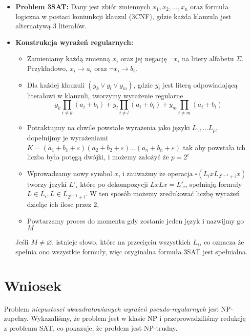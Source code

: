 \documentclass[11pt]{scrartcl}
\begin{document}
\begin{itemize}
    \item \textbf{Problem 3SAT:} Dany jest zbiór zmiennych \( x_1, x_2, \ldots, x_n \) oraz formuła logiczna w postaci koniunkcji klauzul (3CNF), gdzie każda klauzula jest alternatywą 3 literałów.
    \item \textbf{Konstrukcja wyrażeń regularnych:}
    \begin{itemize}
        \item Zamieniamy każdą zmienną \( x_i \) oraz jej negację \( \neg x_i \) na litery alfabetu \( \Sigma \). Przykładowo, \( x_i \rightarrow a_i \) oraz \( \neg x_i \rightarrow b_i \).
      \item Dla każdej klauzuli \( (y_k \lor y_l \lor y_m) \), gdzie \( y_i \) jest literą odpowiadającą literałowi w klauzuli, tworzymy wyrażenie regularne 
        \[ 
          y_k \prod_{i \not = k} (a_i + b_i) + y_l \prod_{i \not = l} (a_i + b_i) + y_m \prod_{i \not = m} (a_i + b_i)
        \]

      \item Potraktujmy na chwile powstałe wyrażenia jako języki $L_1, \dots L_p$, dopełnijmy je wyrażeniami $K = (a_1 + b_1 + \varepsilon)(a_2 + b_2 + \varepsilon) \dots (a_n + b_n + \varepsilon)$ tak aby powstała ich liczba była potęgą dwójki, i możemy założyć że $p = 2^c$
      \item Wprowadzamy nowy symbol $x$, i zauważmy że operacja $\square(L_i x L_{2^{c-1}+i} x)$ tworzy języki $L'_i$ które po dekompozycji $L x L x = L'_i$, spełniają formuły $L \in L_i, L \in L_{2^{c-1}+i}$. W ten sposób możemy zredukować liczbę wyrażeń dzieląc ich ilosc przez 2,
      \item Powtarzamy proces do momentu gdy zostanie jeden język i nazwijmy go $M$ 
    \end{itemize}
      Jeśli $M \not = \varnothing$, istnieje słowo, które na przecięciu wszystkich $L_i$, co oznacza że spełnia ono wszystkie formuły, więc oryginalna formuła 3SAT jest spełnialna.
\end{itemize}

\section*{Wniosek}

Problem \textit{niepustosci ukwadratowianych wyrażeń pseudo-regularnych} jest NP-zupełny. Wykazaliśmy, że problem jest w klasie NP i przeprowadziliśmy redukcję z problemu SAT, co pokazuje, że problem jest NP-trudny.
\end{document}
